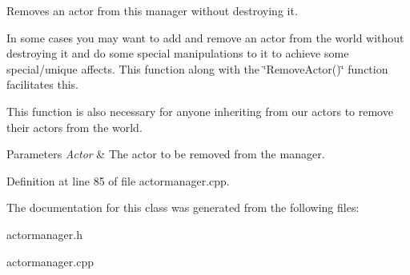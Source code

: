 Removes an actor from this manager without destroying it. 

In some cases you may want to add and remove an actor from the world without destroying it and do some special manipulations to it to achieve some special/unique affects. This function along with the \char`\"{}RemoveActor()\char`\"{} function facilitates this. \par
 This function is also necessary for anyone inheriting from our actors to remove their actors from the world. 
\begin{DoxyParams}{Parameters}
{\em Actor} & The actor to be removed from the manager. \\
\hline
\end{DoxyParams}


Definition at line 85 of file actormanager.cpp.



The documentation for this class was generated from the following files:\begin{DoxyCompactItemize}
\item 
actormanager.h\item 
actormanager.cpp\end{DoxyCompactItemize}
